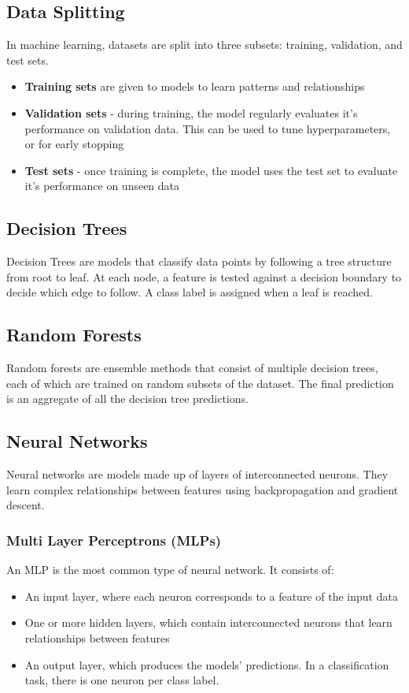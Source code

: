 \documentclass[ oneside,%
                    author={Jack Jarvis},
                    degree={BSc},
                     title={FlexIR: Flexible PCB Wristbands for Infrared Based Gesture Recognition},
                    unit={COMS30045},
                    subtitle={Investigating the Effect of LED Viewing Angle on Gesture Classification in Infrared Sensing Systems}]{dissertation}
\begin{document}
\subsection{Data Splitting}
In machine learning, datasets are split into three subsets: training, validation, and test sets.

\begin{itemize}
    \item \textbf{Training sets} are given to models to learn patterns and relationships
    \item \textbf{Validation sets} - during training, the model regularly evaluates it's performance on validation data. This can be used to tune hyperparameters, or for early stopping
    \item \textbf{Test sets} - once training is complete, the model uses the test set to evaluate it's performance on unseen data
\end{itemize}

\subsection{Decision Trees}
Decision Trees are models that classify data points by following a tree structure from root to leaf. At each node, a feature is tested against a decision boundary to decide which edge to follow. A class label is assigned when a leaf is reached.
\subsection{Random Forests}
Random forests are ensemble methods that consist of multiple decision trees, each of which are trained on random subsets of the dataset. The final prediction is an aggregate of all the decision tree predictions. 
\subsection{Neural Networks}
Neural networks are models made up of layers of interconnected neurons. They learn complex relationships between features using backpropagation and gradient descent.
\subsubsection{Multi Layer Perceptrons (MLPs)}
An MLP is the most common type of neural network. It consists of:
\begin{itemize}
    \item An input layer, where each neuron corresponds to a feature of the input data
    \item One or more hidden layers, which contain interconnected neurons that learn relationships between features
    \item An output layer, which produces the models' predictions. In a classification task, there is one neuron per class label.
\end{itemize}
\end{document}
